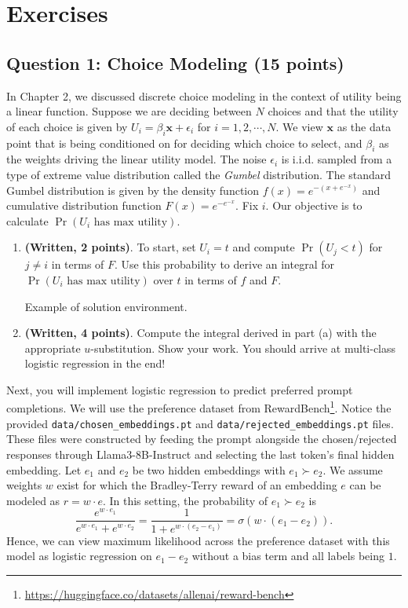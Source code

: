 \documentclass[
  letterpaper,
  numbers=noenddot,
  DIV=11]{scrreprt}
\theoremstyle{definition}
\theoremstyle{plain}
\theoremstyle{plain}
\theoremstyle{remark}
\DeclareRobustCommand{\href}[2]{#2\footnote{\url{#1}}}
\begin{document}
\section{Exercises}\label{exercises}

\subsection*{Question 1: Choice Modeling (15
points)}\label{question-1-choice-modeling-15-points}

In Chapter 2, we discussed discrete choice modeling in the context of
utility being a linear function. Suppose we are deciding between \(N\)
choices and that the utility of each choice is given by
\(U_i=\beta_i\mathbf{x}+\epsilon_i\) for \(i=1, 2, \cdots, N\). We view
\(\mathbf{x}\) as the data point that is being conditioned on for
deciding which choice to select, and \(\beta_i\) as the weights driving
the linear utility model. The noise \(\epsilon_i\) is i.i.d. sampled
from a type of extreme value distribution called the \emph{Gumbel}
distribution. The standard Gumbel distribution is given by the density
function \(f(x)=e^{-(x+e^{-x})}\) and cumulative distribution function
\(F(x)=e^{-e^{-x}}.\) Fix \(i\). Our objective is to calculate
\(\Pr(U_i\,\, \text{has max utility})\).

\begin{enumerate}
\def\labelenumi{(\alph{enumi})}
\item
  \textbf{(Written, 2 points)}. To start, set \(U_i=t\) and compute
  \(\Pr(U_j<t)\) for \(j\neq i\) in terms of \(F\). Use this probability
  to derive an integral for \(\Pr(U_i\,\,  \text{has max utility})\)
  over \(t\) in terms of \(f\) and \(F\).

  Example of solution environment.
\item
  \textbf{(Written, 4 points)}. Compute the integral derived in part (a)
  with the appropriate \(u\)-substitution. Show your work. You should
  arrive at multi-class logistic regression in the end!
\end{enumerate}

Next, you will implement logistic regression to predict preferred prompt
completions. We will use the preference dataset from
\href{https://huggingface.co/datasets/allenai/reward-bench}{RewardBench}.
Notice the provided \texttt{data/chosen\_embeddings.pt} and
\texttt{data/rejected\_embeddings.pt} files. These files were
constructed by feeding the prompt alongside the chosen/rejected
responses through Llama3-8B-Instruct and selecting the last token's
final hidden embedding. Let \(e_1\) and \(e_2\) be two hidden embeddings
with \(e_1\succ e_2\). We assume weights \(w\) exist for which the
Bradley-Terry reward of an embedding \(e\) can be modeled as
\(r=w\cdot e\). In this setting, the probability of \(e_1\succ e_2\) is
\[\frac{e^{w\cdot e_1}}{e^{w\cdot e_1}+e^{w\cdot e_2}}=\frac{1}{1+e^{w\cdot(e_2-e_1)}}=\sigma(w\cdot(e_1-e_2)).\]
Hence, we can view maximum likelihood across the preference dataset with
this model as logistic regression on \(e_1-e_2\) without a bias term and
all labels being \(1\).
\end{document}
